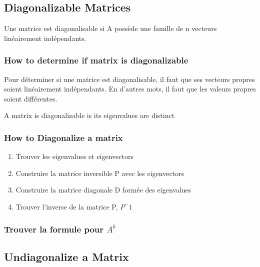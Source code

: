 \documentclass{article}
\begin{document}
\subsection{Diagonalizable Matrices}%
\label{sub:Diagonalizable Matrices}

\begin{definition}
    Une matrice est diagonalisable si A possède une famille de n vecteurs
    linéairement indépendants.
\end{definition}

\subsubsection{How to determine if matrix is diagonalizable}%
\label{ssub:How to determine if matrix is diagonalizable}

Pour déterminer si une matrice est diagonalisable, il faut que ses vecteurs
propres soient linéairement indépendants. En d'autres mots, il faut que les
valeurs propres soient différentes.

\begin{theorem}
    A matrix is diagonalizable is its eigenvalues are distinct
\end{theorem}

\subsubsection{How to Diagonalize a matrix}%
\label{ssub:How to Diagonalize a matrix}

\begin{enumerate}
    \item Trouver les eigenvalues et eigenvectors
    \item Construire la matrice inversible P avec les eigenvectors
    \item Construire la matrice diagonale D formée des eigenvalues
    \item Trouver l'inverse de la matrice P, $P^-1$
\end{enumerate}

\subsubsection{Trouver la formule pour $A^k$}%
\label{ssub:Trouver la formule pour $A^k$}

\subsection{Undiagonalize a Matrix}
\end{document}
